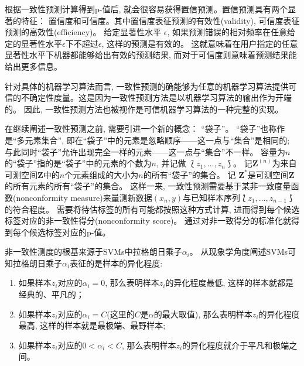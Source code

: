 根据一致性预测计算得到p-值后, 就会很容易获得置信预测。置信预测具有两个显著的特征： 置信度和可信度。其中置信度表征预测的有效性(validity), 可信度表征预测的高效性(efficiency)。 给定显著性水平 $\epsilon$, 如果预测错误的相对频率在任意给定的显著性水平$\epsilon$下不超过$\epsilon$, 这样的预测是有效的。 这就意味着在用户指定的任意显著性水平下机器都能够给出有效的预测结果, 而对于可信度则意味着预测结果能给出更多信息。 

针对具体的机器学习算法而言, 一致性预测的确能够为任意的机器学习算法提供可信的不确定性度量。这是因为一致性预测方法是以机器学习算法的输出作为开端的。 因此, 一致性预测方法也被视作是可信机器学习算法的一种完整的实现。 

在继续阐述一致性预测之前, 需要引进一个新的概念： “袋子”。 “袋子”也称作是“多元素集合”, 即在“袋子”中的元素是忽略顺序——这一点与“集合”是相同的; 与此同时“袋子”允许出现完全一样的元素——这一点与“集合”不一样。 容量为$n$的“袋子”指的是“袋子”中的元素的个数为$n$, 并记做 $\Lbag z_1, \ldots, z_{n} \Rbag$。 记$\mathbf{Z}^{(n)}$为来自可测空间$\mathbf{Z}$中的$n$个元素组成的大小为$n$的所有“袋子”的集合。 记 $\mathbf{Z}^{*}$是可测空间$\mathbf{Z}$的所有元素的所有“袋子”的集合。 这样一来, 一致性预测需要基于某非一致度量函数(nonconformity measure)来量测新数据$(x_{n}, y)$与已知样本序列$\Lbag z_1, \ldots, z_{n-1} \Rbag$的符合程度。 需要将待估标签的所有可能都按照这种方式计算, 进而得到每个候选标签对应的非一致性得分(nonconformity score)。 通过对非一致得分的标准化就得到每个候选标签对应的p-值。

非一致性测度的根基来源于SVMs中拉格朗日乘子$\alpha_{i}$\citep{Vovk2013,vovk2005algorithmic,vovk2022algorithmic}。 从现象学角度阐述SVMs可知拉格朗日乘子$\alpha_{i}$表征的是样本的异化程度:
\begin{enumerate}
\item 如果样本$z_{i}$对应的$\alpha_{i} = 0$, 那么表明样本$z_{i}$的异化程度最低, 这样的样本就都是经典的、平凡的；
\item 如果样本$z_{i}$对应的$\alpha_{i} = C$(这里的$C$是$\alpha$的最大取值), 那么表明样本$z_{i}$的异化程度最高, 这样的样本就是最极端、最野样本;
\item 如果样本$z_{i}$对应的$0 < \alpha_{i} < C$, 那么表明样本$z_{i}$的异化程度就介于平凡和极端之间。
\end{enumerate}

